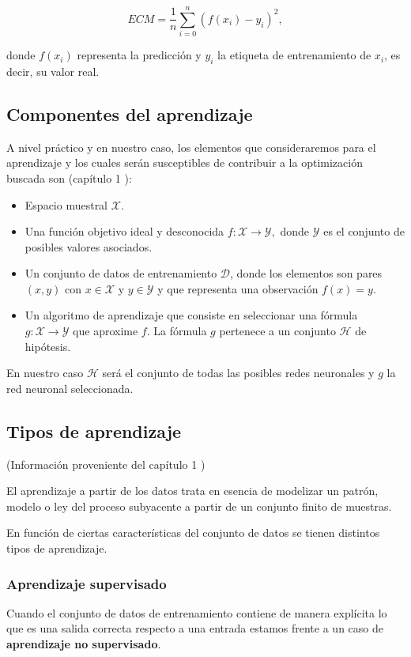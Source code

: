 $$ECM = \frac{1}{n} \sum_{i=0} ^n (f(x_i) - y_i)^2,$$

donde $f(x_i)$ representa la predicción y $y_i$ la etiqueta de entrenamiento de $x_i$, es decir, su valor real.

\subsection{Componentes del aprendizaje}\label{sub:componentes_aprendizaje}  
A nivel práctico y en nuestro caso, los elementos que consideraremos para el aprendizaje y los cuales 
serán susceptibles de contribuir a la optimización buscada son
(capítulo 1 \cite{MostafaLearningFromData}): 


\begin{itemize}
    \item Espacio muestral $\mathcal X$.  
    \item Una función objetivo ideal y desconocida
     $f: \mathcal X \longrightarrow \mathcal{Y},$ 
     donde  $\mathcal{Y}$ es el conjunto de posibles valores asociados. 
    \item Un conjunto de datos de entrenamiento $\mathcal D$, donde los elementos son pares $(x,y)$ con $x \in  \mathcal X$ y 
    $y \in \mathcal{Y}$ y que representa una observación $f(x)=y.$
    \item Un algoritmo de aprendizaje que consiste en seleccionar una fórmula $g: \mathcal X \longrightarrow \mathcal{Y}$ que aproxime $f$. La fórmula $g$ pertenece 
    a un conjunto $\mathcal H$ de hipótesis. 
\end{itemize}

En nuestro caso $\mathcal{H}$ será el conjunto de todas las posibles redes neuronales y $g$ la red neuronal seleccionada. 


\subsection{Tipos de aprendizaje}  

(Información proveniente del capítulo 1 \cite{MostafaLearningFromData})

El aprendizaje a partir de los datos trata en esencia de modelizar un patrón, modelo o ley del proceso subyacente a partir de un conjunto finito de muestras.  

En función de ciertas características del conjunto de datos se 
tienen distintos tipos de aprendizaje.  

\subsubsection{Aprendizaje supervisado}
Cuando el conjunto de datos de entrenamiento contiene de manera explícita lo que es una salida correcta respecto a una entrada estamos frente a un caso de \textbf{aprendizaje no supervisado}.   

